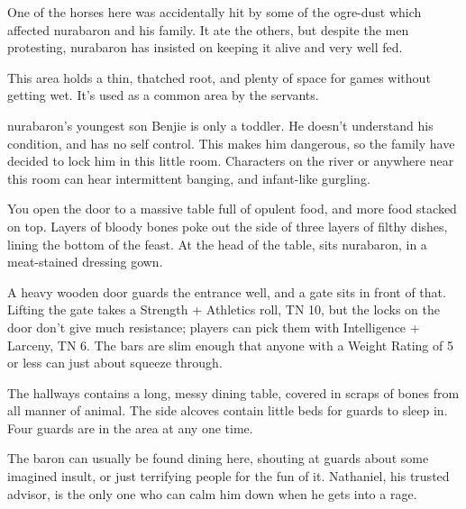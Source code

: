 \begin{multicols}{2}
One of the horses here was accidentally hit by some of the ogre-dust which affected \gls{nurabaron} and his family.  It ate the others, but despite the men protesting, \gls{nurabaron} has insisted on keeping it alive and very well fed.


This area holds a thin, thatched root, and plenty of space for games without getting wet.
It's used as a common area by the servants.


\Gls{nurabaron}'s youngest son Benjie is only a toddler.
He doesn't understand his condition, and has no self control.
This makes him dangerous, so the family have decided to lock him in this little room.
Characters on the river or anywhere near this room can hear intermittent banging, and infant-like gurgling.


\begin{boxtext}

  You open the door to a massive table full of opulent food, and more food stacked on top.  Layers of bloody bones poke out the side of three layers of filthy dishes, lining the bottom of the feast.  At the head of the table, sits \gls{nurabaron}, in a meat-stained dressing gown.

\end{boxtext}

A heavy wooden door guards the entrance well, and a gate sits in front of that.  Lifting the gate takes a Strength + Athletics roll, TN 10, but the locks on the door don't give much resistance; players can pick them with Intelligence + Larceny, TN 6.  The bars are slim enough that anyone with a Weight Rating of 5 or less can just about squeeze through.

The hallways contains a long, messy dining table, covered in scraps of bones from all manner of animal.  The side alcoves contain little beds for guards to sleep in.  Four guards are in the area at any one time.

The baron can usually be found dining here, shouting at guards about some imagined insult, or just terrifying people for the fun of it.  Nathaniel, his trusted advisor, is the only one who can calm him down when he gets into a rage.



\end{multicols}
